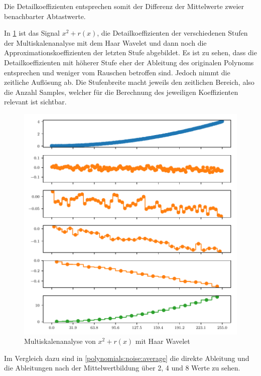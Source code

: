 \begin{refsection}
Die Detailkoeffizienten entsprechen somit der Differenz der Mittelwerte zweier
benachbarter Abtastwerte.

In \cref{polynomials:noise:db1_multi} ist das Signal $x^2 + r(x)$, die
Detailkoeffizienten der verschiedenen Stufen der Multiskalenanalyse mit dem
Haar Wavelet und dann noch die Approximationskoeffizienten der letzten Stufe
abgebildet. Es ist zu sehen, dass die Detailkoeffizienten mit höherer Stufe
eher der Ableitung des originalen Polynoms entsprechen und weniger vom Rauschen
betroffen sind. Jedoch nimmt die zeitliche Auflösung ab.
Die Stufenbreite macht jeweils den zeitlichen Bereich, also die Anzahl Samples,
welcher für die Berechnung des jeweiligen Koeffizienten relevant ist sichtbar.

\begin{figure}
    \centering
    \includegraphics{papers/polynomials/images/polynomials_noise_db1_multi.pdf}
    \caption{Multiskalenanalyse von $x^2 + r(x)$ mit Haar Wavelet\label{polynomials:noise:db1_multi}}
\end{figure}

Im Vergleich dazu sind in \cref{polynomials:noise:average} die direkte
Ableitung und die Ableitungen nach der Mittelwertbildung über 2, 4 und 8 Werte
zu sehen.


\end{refsection}
